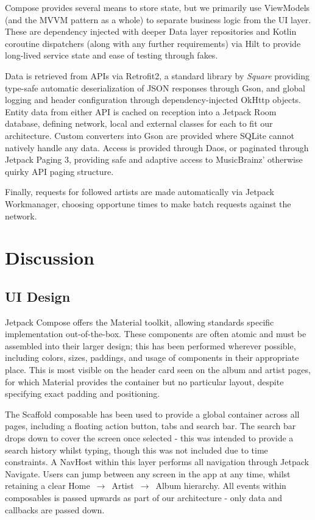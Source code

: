 \documentclass[]{article}
\begin{document}
Compose provides several means to store state, but we primarily use ViewModels (and the MVVM pattern as a whole) to separate business logic from the UI layer. These are dependency injected with deeper Data layer repositories and Kotlin coroutine dispatchers (along with any further requirements) via Hilt to provide long-lived service state and ease of testing through fakes.

Data is retrieved from APIs via Retrofit2, a standard library by \textit{Square} providing type-safe automatic deserialization of JSON responses through Gson, and global logging and header configuration through dependency-injected OkHttp objects. Entity data from either API is cached on reception into a Jetpack Room database, defining network, local and external classes for each to fit our architecture. Custom converters into Gson are provided where SQLite cannot natively handle any data. Access is provided through Daos, or paginated through Jetpack Paging 3, providing safe and adaptive access to MusicBrainz' otherwise quirky API paging structure.

Finally, requests for followed artists are made automatically via Jetpack Workmanager, choosing opportune times to make batch requests against the network.

\section{Discussion}
\subsection{UI Design}
Jetpack Compose offers the Material toolkit, allowing standards specific implementation out-of-the-box. These components are often atomic and must be assembled into their larger design; this has been performed wherever possible, including colors, sizes, paddings, and usage of components in their appropriate place. This is most visible on the header card seen on the album and artist pages, for which Material provides the container but no particular layout, despite specifying exact padding and positioning.

The Scaffold composable has been used to provide a global container across all pages, including a floating action button, tabs and search bar. The search bar drops down to cover the screen once selected - this was intended to provide a search history whilst typing, though this was not included due to time constraints. A NavHost within this layer performs all navigation through Jetpack Navigate. Users can jump between any screen in the app at any time, whilst retaining a clear \mbox{Home $\rightarrow$ Artist $\rightarrow$ Album} hierarchy. All events within composables is passed upwards as part of our architecture - only data and callbacks are passed down. 
\end{document}
